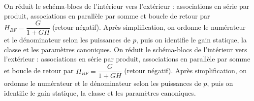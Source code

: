 \begin{corrigebox}[Corrigé]
On réduit le schéma-blocs de l'intérieur vers l'extérieur : associations en série par produit, associations en parallèle par somme et boucle de retour par $H_{BF}=\dfrac{G}{1+GH}$ (retour négatif). Après simplification, on ordonne le numérateur et le dénominateur selon les puissances de $p$, puis on identifie le gain statique, la classe et les paramètres canoniques.
On réduit le schéma-blocs de l'intérieur vers l'extérieur : associations en série par produit, associations en parallèle par somme et boucle de retour par $H_{BF}=\dfrac{G}{1+GH}$ (retour négatif). Après simplification, on ordonne le numérateur et le dénominateur selon les puissances de $p$, puis on identifie le gain statique, la classe et les paramètres canoniques.
\end{corrigebox}
